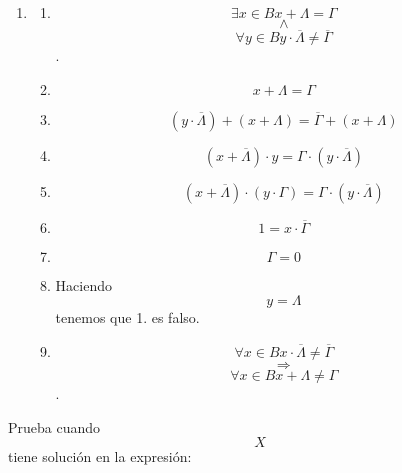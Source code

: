 \begin{enumerate}
\begin{enumerate}
\begin{enumerate}
\begin{enumerate}
\begin{enumerate}
          \begin{enumerate}
          \def\labelenumvi{\arabic{enumvi}.}
          \tightlist
          \item
            \begin{enumerate}
            \def\labelenumvii{\arabic{enumvii}.}
            \tightlist
            \item
              \[\exists{x \in B}{{x + \Lambda} = \Gamma}\]\[\land\]\[\forall{y \in B}{{y \cdot \overline{\Lambda}} \neq \overline{\Gamma}}\].
            \item
              \[{x + \Lambda} = \Gamma\]
            \item
              \[{\left( {y \cdot \overline{\Lambda}} \right) + \left( {x + \Lambda} \right)} = {\overline{\Gamma} + \left( {x + \Lambda} \right)}\]
            \item
              \[{\left( {x + \overline{\Lambda}} \right) \cdot y} = {\Gamma \cdot \left( {y \cdot \overline{\Lambda}} \right)}\]
            \item
              \[{\left( {x + \overline{\Lambda}} \right) \cdot {({y \cdot \Gamma})}} = {\Gamma \cdot \left( {y \cdot \overline{\Lambda}} \right)}\]
            \item
              \[1 = {x \cdot \overline{\Gamma}}\]
            \item
              \[\Gamma = 0\]
            \item
              Haciendo \[y = \Lambda\] tenemos que 1. es falso.
            \item
              \[\forall{x \in B}{{x \cdot \overline{\Lambda}} \neq \overline{\Gamma}}\]\[\Rightarrow\]\[\forall{x \in B}{{x + \Lambda} \neq \Gamma}\].
            \end{enumerate}
          \end{enumerate}

          Prueba cuando \[X\] tiene solución en la expresión:


\end{enumerate}
\end{enumerate}
\end{enumerate}
\end{enumerate}
\end{enumerate}
